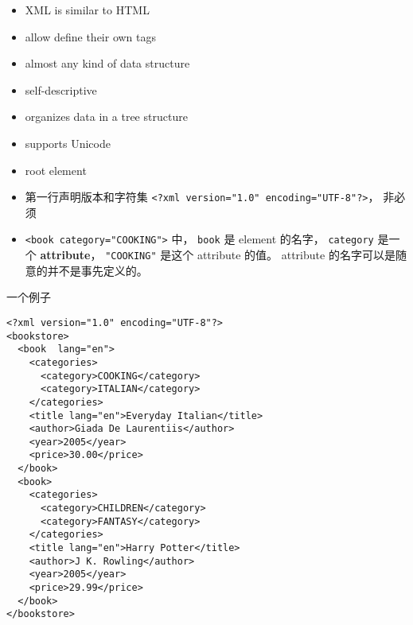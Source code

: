 
\begin{issues}
\issueDraft
\end{issues}

\begin{itemize}
\item XML is similar to HTML
\item allow define their own tags
\item almost any kind of data structure
\item self-descriptive
\item organizes data in a tree structure
\item supports Unicode
\item root element
\item 第一行声明版本和字符集 \verb|<?xml version="1.0" encoding="UTF-8"?>|， 非必须
\item \verb|<book category="COOKING">| 中， \verb|book| 是 element 的名字， \verb|category| 是一个 \textbf{attribute}， \verb|"COOKING"| 是这个 attribute 的值。 attribute 的名字可以是随意的并不是事先定义的。
\end{itemize}

一个例子
\begin{lstlisting}[language=none]
<?xml version="1.0" encoding="UTF-8"?>
<bookstore>
  <book  lang="en">
    <categories>
      <category>COOKING</category>
      <category>ITALIAN</category>
    </categories>
    <title lang="en">Everyday Italian</title>
    <author>Giada De Laurentiis</author>
    <year>2005</year>
    <price>30.00</price>
  </book>
  <book>
    <categories>
      <category>CHILDREN</category>
      <category>FANTASY</category>
    </categories>
    <title lang="en">Harry Potter</title>
    <author>J K. Rowling</author>
    <year>2005</year>
    <price>29.99</price>
  </book>
</bookstore>
\end{lstlisting}
